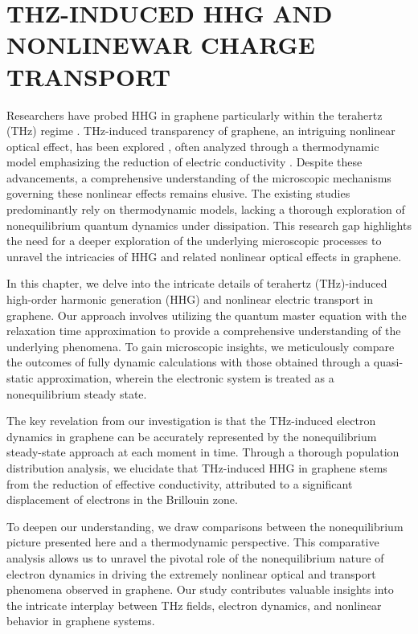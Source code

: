 \chapter{THZ-INDUCED HHG AND NONLINEWAR CHARGE TRANSPORT}

Researchers have probed HHG in graphene particularly within the terahertz (THz) regime \cite{hafez2018extremely,kovalev2021electrical}. THz-induced transparency of graphene, an intriguing nonlinear optical effect, has been explored \cite{Hwang2013,Paul_2013,doi:10.1063/1.4902999}, often analyzed through a thermodynamic model emphasizing the reduction of electric conductivity \cite{mics2015thermodynamic,kovalev2021electrical}.
Despite these advancements, a comprehensive understanding of the microscopic mechanisms governing these nonlinear effects remains elusive. The existing studies predominantly rely on thermodynamic models, lacking a thorough exploration of nonequilibrium quantum dynamics under dissipation. This research gap highlights the need for a deeper exploration of the underlying microscopic processes to unravel the intricacies of HHG and related nonlinear optical effects in graphene.

In this chapter, we delve into the intricate details of terahertz (THz)-induced high-order harmonic generation (HHG) and nonlinear electric transport in graphene. Our approach involves utilizing the quantum master equation with the relaxation time approximation to provide a comprehensive understanding of the underlying phenomena. To gain microscopic insights, we meticulously compare the outcomes of fully dynamic calculations with those obtained through a quasi-static approximation, wherein the electronic system is treated as a nonequilibrium steady state.

The key revelation from our investigation is that the THz-induced electron dynamics in graphene can be accurately represented by the nonequilibrium steady-state approach at each moment in time. Through a thorough population distribution analysis, we elucidate that THz-induced HHG in graphene stems from the reduction of effective conductivity, attributed to a significant displacement of electrons in the Brillouin zone.

To deepen our understanding, we draw comparisons between the nonequilibrium picture presented here and a thermodynamic perspective. This comparative analysis allows us to unravel the pivotal role of the nonequilibrium nature of electron dynamics in driving the extremely nonlinear optical and transport phenomena observed in graphene. Our study contributes valuable insights into the intricate interplay between THz fields, electron dynamics, and nonlinear behavior in graphene systems.

